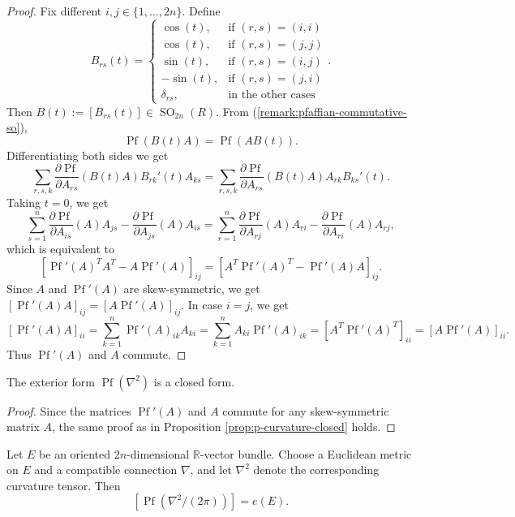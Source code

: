 \documentclass[a4paper,openany]{scrbook}
\begin{document}
\begin{proof}
    Fix different $i,j \in \{1,\dots,2n\}$. Define
    $$B_{rs}(t) = 
    \begin{cases}
        \cos(t),& \text{if }(r,s)=(i,i)\\
        \cos(t),& \text{if }(r,s)=(j,j)\\
        \sin(t),& \text{if }(r,s)=(i,j)\\
        -\sin(t),& \text{if }(r,s)=(j,i)\\
        \delta_{rs},& \text{in the other cases}
    \end{cases}.$$
    Then $B(t):=[B_{rs}(t)] \in \operatorname{SO}_{2n}(R)$. From (\ref{remark:pfaffian-commutative-so}),
    $$\operatorname{Pf}(B(t)A) = \operatorname{Pf}(AB(t)).$$
    Differentiating both sides we get
    $$\sum_{r,s,k} \frac{\partial \operatorname{Pf}}{\partial A_{rs}}(B(t)A) B_{rk}'(t)A_{ks} = \sum_{r,s,k} \frac{\partial \operatorname{Pf}}{\partial A_{rs}}(B(t)A) A_{rk}B_{ks}'(t).$$
    Taking $t=0$, we get
    $$\sum_{s=1}^n \frac{\partial \operatorname{Pf}}{\partial A_{is}}(A)A_{js} - \frac{\partial \operatorname{Pf}}{\partial A_{js}}(A)A_{is} = \sum_{r=1}^n \frac{\partial \operatorname{Pf}}{\partial A_{rj}}(A) A_{ri} - \frac{\partial \operatorname{Pf}}{\partial A_{ri}}(A) A_{rj},$$
    which is equivalent to
    $$[\operatorname{Pf}'(A)^TA^T - A\operatorname{Pf}'(A)]_{ij} = [A^T\operatorname{Pf}'(A)^T - \operatorname{Pf}'(A)A]_{ij}.$$
    Since $A$ and $\operatorname{Pf}'(A)$ are skew-symmetric, we get $[\operatorname{Pf}'(A)A]_{ij} = [A\operatorname{Pf}'(A)]_{ij}$. In case $i=j$, we get
    $$[\operatorname{Pf}'(A)A]_{ii} = \sum_{k=1}^n \operatorname{Pf}'(A)_{ik}A_{ki} = \sum_{k=1}^n A_{ki} \operatorname{Pf}'(A)_{ik} = [A^T\operatorname{Pf}'(A)^T]_{ii} = [A\operatorname{Pf}'(A)]_{ii}.$$
    Thus $\operatorname{Pf}'(A)$ and $A$ commute.
\end{proof}

\begin{prop}
    The exterior form $\operatorname{Pf}(\nabla^2)$ is a closed form.
\end{prop}

\begin{proof}
    Since the matrices $\operatorname{Pf}'(A)$ and $A$ commute for any skew-symmetric matrix $A$, the same proof as in Proposition \ref{prop:p-curvature-closed} holds.
\end{proof}

\begin{thm}
    Let $E$ be an oriented $2n$-dimensional $\mathbb{R}$-vector bundle. Choose a Euclidean metric on $E$ and a compatible connection $\nabla$, and let $\nabla^2$ denote the corresponding curvature tensor. Then
    $$[\operatorname{Pf}(\nabla^2/(2\pi))] = e(E).$$
\end{thm}
\end{document}
